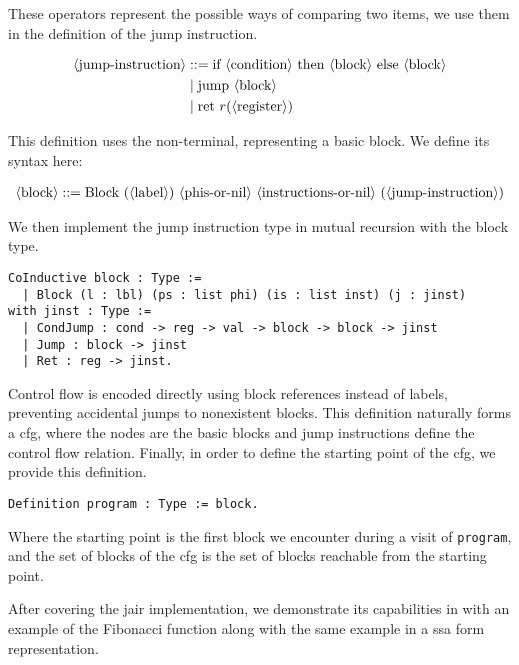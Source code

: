 These operators represent the possible ways of comparing two items, we use them in the definition of the jump instruction.

\begin{align*}
\langle\text{jump-instruction}\rangle &::= \text{if} \ \langle\text{condition}\rangle \ \text{then} \ \langle\text{block}\rangle \ \text{else} \ \langle\text{block}\rangle \\
&\mid \text{jump} \ \langle\text{block}\rangle \\
&\mid \text{ret} \ r( \langle\text{register}\rangle )
\end{align*}

This definition uses the  non-terminal, representing a basic block. We define its syntax here:

\begin{align*}
\nt{block} ::= \text{Block} \ ( \nt{label} ) \ \nt{phis-or-nil} \ \nt{instructions-or-nil} \ ( \nt{jump-instruction} )
\end{align*}

We then implement the jump instruction type in mutual recursion with the block type.

\begin{lstlisting}[style=Rocq]
CoInductive block : Type :=
  | Block (l : lbl) (ps : list phi) (is : list inst) (j : jinst)
with jinst : Type :=
  | CondJump : cond -> reg -> val -> block -> block -> jinst
  | Jump : block -> jinst
  | Ret : reg -> jinst.
\end{lstlisting}

Control flow is encoded directly using block references instead of labels, preventing accidental jumps to nonexistent blocks. This definition naturally forms a \gls{cfg}, where the nodes are the basic blocks and jump instructions define the control flow relation. Finally, in order to define the starting point of the \gls{cfg}, we provide this definition.

\begin{lstlisting}[style=Rocq]
Definition program : Type := block.
\end{lstlisting}

Where the starting point is the first block we encounter during a visit of \texttt{program}, and the set of blocks of the \gls{cfg} is the set of blocks reachable from the starting point.

After covering the \gls{jair} implementation, we demonstrate its capabilities in  with an example of the Fibonacci function along with the same example in a \gls{ssa} form representation.

